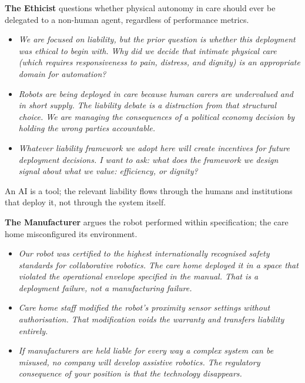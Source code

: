 \medskip
\noindent\textbf{The Ethicist} questions whether physical autonomy in care should
    ever be delegated to a non-human agent, regardless of performance metrics.
    \begin{itemize}
        \item \textit{We are focused on liability, but the prior question is
        whether this deployment was ethical to begin with. Why did we decide
        that intimate physical care (which requires responsiveness to
        pain, distress, and dignity) is an appropriate domain for
        automation?}
        \item \textit{Robots are being deployed in care because human carers
        are undervalued and in short supply. The liability debate is a
        distraction from that structural choice. We are managing the
        consequences of a political economy decision by holding the wrong
        parties accountable.}
        \item \textit{Whatever liability framework we adopt here will create
        incentives for future deployment decisions. I want to ask: what does
        the framework we design signal about what we value: efficiency,
        or dignity?}
    \end{itemize}



\quad An AI is a tool; the relevant
liability flows through the humans and institutions that deploy it,
not through the system itself.
\vspace{1.5em}


\medskip
\noindent\textbf{The Manufacturer} argues the robot performed within specification;
    the care home misconfigured its environment.
    \begin{itemize}
        \item \textit{Our robot was certified to the highest internationally
        recognised safety standards for collaborative robotics. The care home
        deployed it in a space that violated the operational envelope
        specified in the manual. That is a deployment failure, not a
        manufacturing failure.}
        \item \textit{Care home staff modified the robot's proximity sensor
        settings without authorisation. That modification voids the warranty
        and transfers liability entirely.}
        \item \textit{If manufacturers are held liable for every way a
        complex system can be misused, no company will develop assistive
        robotics. The regulatory consequence of your position is that the
        technology disappears.}
    \end{itemize}

